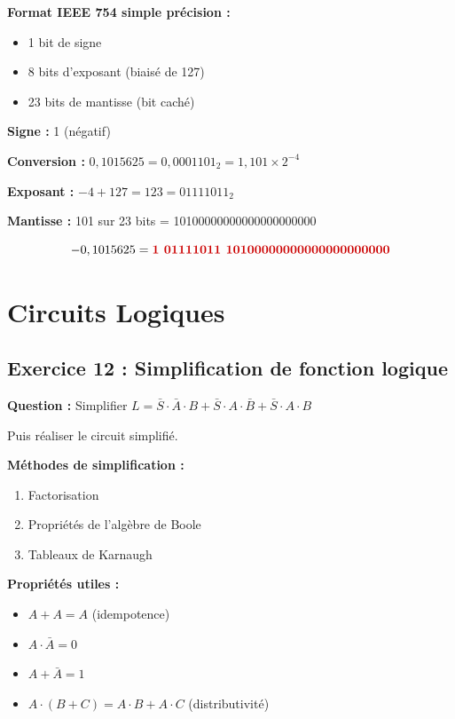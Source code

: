 \documentclass[12pt,a4paper]{article}
\begin{document}
\begin{methode}
\textbf{Format IEEE 754 simple précision :}
\begin{itemize}
    \item 1 bit de signe
    \item 8 bits d'exposant (biaisé de 127)
    \item 23 bits de mantisse (bit caché)
\end{itemize}
\end{methode}

\begin{solution}
\textbf{Signe :} 1 (négatif)

\textbf{Conversion :} $0,1015625 = 0,0001101_2 = 1,101 \times 2^{-4}$

\textbf{Exposant :} $-4 + 127 = 123 = 01111011_2$

\textbf{Mantisse :} 101 sur 23 bits = 10100000000000000000000

$$-0,1015625 = \textcolor{importantrouge}{\textbf{1\ 01111011\ 10100000000000000000000}}$$
\end{solution}

\newpage
\section{Circuits Logiques}

\subsection{Exercice 12 : Simplification de fonction logique}

\begin{exercice}
\textbf{Question :} Simplifier $L = \bar{S} \cdot \bar{A} \cdot B + \bar{S} \cdot A \cdot \bar{B} + \bar{S} \cdot A \cdot B$

Puis réaliser le circuit simplifié.
\end{exercice}

\begin{methode}
\textbf{Méthodes de simplification :}
\begin{enumerate}
    \item Factorisation
    \item Propriétés de l'algèbre de Boole
    \item Tableaux de Karnaugh
\end{enumerate}

\textbf{Propriétés utiles :}
\begin{itemize}
    \item $A + A = A$ (idempotence)
    \item $A \cdot \bar{A} = 0$
    \item $A + \bar{A} = 1$
    \item $A \cdot (B + C) = A \cdot B + A \cdot C$ (distributivité)
\end{itemize}
\end{methode}
\end{document}
